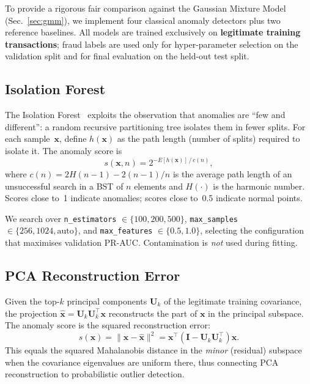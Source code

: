 %

\label{sec:baselines}

To provide a rigorous fair comparison against the Gaussian Mixture Model
(Sec.~\ref{sec:gmm}), we implement four classical anomaly detectors plus
two reference baselines.  All models are trained exclusively on
\textbf{legitimate training transactions}; fraud labels are used only for
hyper-parameter selection on the validation split and for final evaluation
on the held-out test split.

\subsection{Isolation Forest}
\label{sec:iforest}

The Isolation Forest~\cite{liu2008isolation} exploits the observation that
anomalies are ``few and different'': a random recursive partitioning tree
isolates them in fewer splits.  For each sample~$\mathbf{x}$, define
$h(\mathbf{x})$ as the path length (number of splits) required to isolate
it.  The anomaly score is
\begin{equation}
    s(\mathbf{x}, n) = 2^{-E[h(\mathbf{x})]\,/\,c(n)},
    \label{eq:iforest_score}
\end{equation}
where $c(n) = 2H(n-1) - 2(n-1)/n$ is the average path length of an
unsuccessful search in a BST of $n$ elements and $H(\cdot)$ is the harmonic
number.  Scores close to~1 indicate anomalies; scores close to~0.5 indicate
normal points.

We search over \texttt{n\_estimators} $\in \{100, 200, 500\}$,
\texttt{max\_samples} $\in \{256, 1024, \text{auto}\}$, and
\texttt{max\_features} $\in \{0.5, 1.0\}$, selecting the configuration that
maximises validation PR-AUC.  Contamination is \emph{not} used during fitting.

\subsection{PCA Reconstruction Error}
\label{sec:pca_recon}

Given the top-$k$ principal components $\mathbf{U}_k$ of the legitimate
training covariance, the projection $\hat{\mathbf{x}} =
\mathbf{U}_k \mathbf{U}_k^\top \mathbf{x}$ reconstructs the part of
$\mathbf{x}$ in the principal subspace.  The anomaly score is the squared
reconstruction error:
\begin{equation}
    s(\mathbf{x}) = \|\mathbf{x} - \hat{\mathbf{x}}\|^2
                  = \mathbf{x}^\top (\mathbf{I} - \mathbf{U}_k \mathbf{U}_k^\top) \mathbf{x}.
    \label{eq:pca_recon}
\end{equation}
This equals the squared Mahalanobis distance in the \emph{minor}
(residual) subspace when the covariance eigenvalues are uniform there, thus
connecting PCA reconstruction to probabilistic outlier detection.

